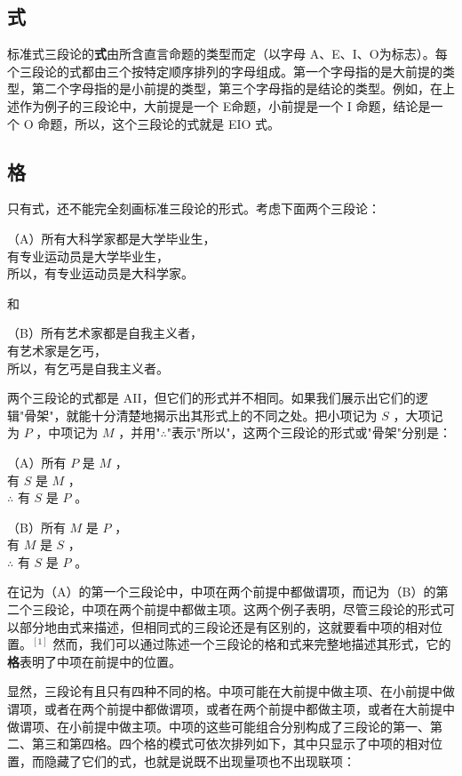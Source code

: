 \subsection{式}
标准式三段论的\textbf{式}由所含直言命题的类型而定（以字母 A、E、I、O为标志）。每个三段论的式都由三个按特定顺序排列的字母组成。第一个字母指的是大前提的类型，第二个字母指的是小前提的类型，第三个字母指的是结论的类型。例如，在上述作为例子的三段论中，大前提是一个 E命题，小前提是一个 I 命题，结论是一个 O 命题，所以，这个三段论的式就是 EIO 式。

\subsection{格}
只有式，还不能完全刻画标准三段论的形式。考虑下面两个三段论：

（A）所有大科学家都是大学毕业生，\\
有专业运动员是大学毕业生，\\
所以，有专业运动员是大科学家。

和

（B）所有艺术家都是自我主义者，\\
有艺术家是乞丐，\\
所以，有乞丐是自我主义者。

两个三段论的式都是 AII，但它们的形式并不相同。如果我们展示出它们的逻辑"骨架"，就能十分清楚地揭示出其形式上的不同之处。把小项记为 $S$ ，大项记为 $P$ ，中项记为 $M$ ，并用"$\therefore$"表示"所以"，这两个三段论的形式或"骨架"分别是：

（A）所有 $P$ 是 $M$ ，\\
有 $S$ 是 $M$ ，\\
$\therefore$ 有 $S$ 是 $P$ 。

（B）所有 $M$ 是 $P$ ，\\
有 $M$ 是 $S$ ，\\
$\therefore$ 有 $S$ 是 $P$ 。

在记为（A）的第一个三段论中，中项在两个前提中都做谓项，而记为（B）的第二个三段论，中项在两个前提中都做主项。这两个例子表明，尽管三段论的形式可以部分地由式来描述，但相同式的三段论还是有区别的，这就要看中项的相对位置。$^{[1]}$ 然而，我们可以通过陈述一个三段论的格和式来完整地描述其形式，它的\textbf{格}表明了中项在前提中的位置。

显然，三段论有且只有四种不同的格。中项可能在大前提中做主项、在小前提中做谓项，或者在两个前提中都做谓项，或者在两个前提中都做主项，或者在大前提中做谓项、在小前提中做主项。中项的这些可能组合分别构成了三段论的第一、第二、第三和第四格。四个格的模式可依次排列如下，其中只显示了中项的相对位置，而隐藏了它们的式，也就是说既不出现量项也不出现联项：

